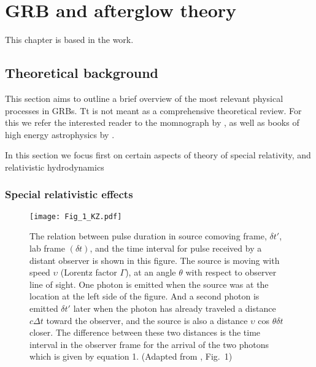 
\chapter{GRB and afterglow theory} %

\label{app:afg} %

This chapter is based in the \cite{Kumar:2014upa} work.

\section{Theoretical background}

This section aims to outline a brief overview of the most relevant physical processes in GRBs. Tt is not meant as a comprehensive theoretical review. For this we refer the interested reader to the momnograph by \citet{RybickiLightman:1985}, as well as books of high energy astrophysics by \citet{Longair:2011,Dermer:2009}.

In this section we focus first on certain aspects of theory of special relativity, and relativistic hydrodynamics 


\subsection{Special relativistic effects}

\begin{figure*}[t]
    \centering 
    \texttt{[image: Fig\_1\_KZ.pdf]}
    \caption{
        The relation between pulse duration in source comoving frame, $\delta t'$, lab frame
        $(\delta t)$, and the time interval for pulse received by a distant observer is shown in this figure. The source is moving with speed $\upsilon$ (Lorentz factor $\Gamma$), at an angle $\theta$ with
        respect to observer line of sight. One photon is emitted when the source was at the
        location at the left side of the figure. And a second photon is emitted $\delta t'$ later when
        the photon has already traveled a distance $c\Delta t$ toward the observer, and the source
        is also a distance $\upsilon$ cos $\theta\delta t$ closer. The difference between these two distances is the
        time interval in the observer frame for the arrival of the two photons which is given
        by equation 1.
        (Adapted from \citet{Kumar:2014upa}, Fig.~1)
    }
    \label{fig:aafg:theory:sr1}
\end{figure*}

